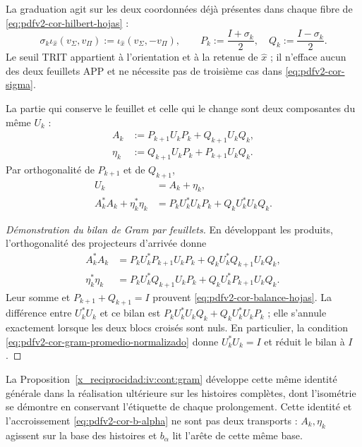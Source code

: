 La graduation agit sur les deux coordonnées déjà présentes dans chaque fibre de \eqref{eq:pdfv2-cor-hilbert-hojas} :
\begin{equation}
\label{eq:pdfv2-cor-sigma}
 \sigma_k\iota_{\widehat x}(v_\Sigma,v_\Pi)
 :=\iota_{\widehat x}(v_\Sigma,-v_\Pi),
\qquad
 P_k:=\frac{I+\sigma_k}{2},\quad
 Q_k:=\frac{I-\sigma_k}{2}.
\end{equation}
Le seuil TRIT appartient à l'orientation et à la retenue de \(\widehat x\) ; il n'efface aucun des deux feuillets APP et ne nécessite pas de troisième cas dans \eqref{eq:pdfv2-cor-sigma}.

La partie qui conserve le feuillet et celle qui le change sont deux composantes du même \(U_k\) :
\begin{align}
 A_k&:=P_{k+1}U_kP_k+Q_{k+1}U_kQ_k,
 \label{eq:pdfv2-cor-a-comun}\\
 \eta_k&:=Q_{k+1}U_kP_k+P_{k+1}U_kQ_k.
 \label{eq:pdfv2-cor-eta-comun}
\end{align}
Par orthogonalité de \(P_{k+1}\) et de \(Q_{k+1}\),
\begin{equation}
\label{eq:pdfv2-cor-balance-hojas}
 \begin{aligned}
 U_k&=A_k+\eta_k,\\
 A_k^*A_k+\eta_k^*\eta_k
 &=P_kU_k^*U_kP_k+Q_kU_k^*U_kQ_k.
 \end{aligned}
\end{equation}
\begin{proof}[Démonstration du bilan de Gram par feuillets]
En développant les produits, l'orthogonalité des projecteurs d'arrivée donne
\[
\begin{aligned}
 A_k^*A_k
 &=P_kU_k^*P_{k+1}U_kP_k+Q_kU_k^*Q_{k+1}U_kQ_k,\\
 \eta_k^*\eta_k
 &=P_kU_k^*Q_{k+1}U_kP_k+Q_kU_k^*P_{k+1}U_kQ_k.
\end{aligned}
\]
Leur somme et \(P_{k+1}+Q_{k+1}=I\) prouvent \eqref{eq:pdfv2-cor-balance-hojas}. La différence entre \(U_k^*U_k\) et ce bilan est \(P_kU_k^*U_kQ_k+Q_kU_k^*U_kP_k\) ; elle s'annule exactement lorsque les deux blocs croisés sont nuls. En particulier, la condition \eqref{eq:pdfv2-cor-gram-promedio-normalizado} donne \(U_k^*U_k=I\) et réduit le bilan à \(I\).
\end{proof}
La Proposition~\ref{x_reciprocidad:iv:cont:gram} développe cette même identité générale dans la réalisation ultérieure sur les histoires complètes, dont l'isométrie se démontre en conservant l'étiquette de chaque prolongement. Cette identité et l'accroissement \eqref{eq:pdfv2-cor-b-alpha} ne sont pas deux transports : \(A_k,\eta_k\) agissent sur la base des histoires et \(b_\alpha\) lit l'arête de cette même base.

